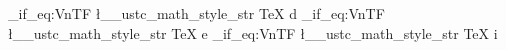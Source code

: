 

\graphicspath{{figures/}}

\ExplSyntaxOn
\NewDocumentCommand \dif {}  %
  {
    \mathop { } \!
    \str_if_eq:VnTF \l__ustc_math_style_str { TeX }
      { d }
      {  }
  }
\NewDocumentCommand \eu {}
  {
    \str_if_eq:VnTF \l__ustc_math_style_str { TeX }
      { e }
      {  }
  }
\NewDocumentCommand \iu {}
  {
    \str_if_eq:VnTF \l__ustc_math_style_str { TeX }
      { i }
      {  }
  }
\ExplSyntaxOff

\DeclareRobustCommand\cs[1]{\texttt{\char`\\#1}}
\DeclareRobustCommand\env[1]{\texttt{#1}}
\DeclareRobustCommand\pkg[1]{\textsf{#1}}
\DeclareRobustCommand\file[1]{\nolinkurl{#1}}

\usepackage{hyperref}
